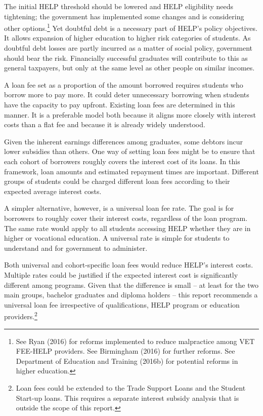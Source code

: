 \documentclass[]{book}
\begin{document}
The initial HELP threshold should be lowered and HELP eligibility needs tightening; the government has implemented some changes and is considering other options.\footnote{See Ryan (2016) for reforms implemented to reduce malpractice among VET FEE-HELP providers. See Birmingham (2016) for further reforms. See Department of Education and Training (2016b) for potential reforms in higher education.} Yet doubtful debt is a necessary part of HELP's policy objectives. It allows expansion of higher education to higher risk categories of students. As doubtful debt losses are partly incurred as a matter of social policy, government should bear the risk. Financially successful graduates will contribute to this as general taxpayers, but only at the same level as other people on similar incomes.

A loan fee set as a proportion of the amount borrowed requires students who borrow more to pay more. It could deter unnecessary borrowing when students have the capacity to pay upfront. Existing loan fees are determined in this manner. It is a preferable model both because it aligns more closely with interest costs than a flat fee and because it is already widely understood.

Given the inherent earnings differences among graduates, some debtors incur lower subsidies than others. One way of setting loan fees might be to ensure that each cohort of borrowers roughly covers the interest cost of its loans. In this framework, loan amounts and estimated repayment times are important. Different groups of students could be charged different loan fees according to their expected average interest costs.

A simpler alternative, however, is a universal loan fee rate. The goal is for borrowers to roughly cover their interest costs, regardless of the loan program. The same rate would apply to all students accessing HELP whether they are in higher or vocational education. A universal rate is simple for students to understand and for government to administer.

Both universal and cohort-specific loan fees would reduce HELP's interest costs. Multiple rates could be justified if the expected interest cost is significantly different among programs. Given that the difference is small -- at least for the two main groups, bachelor graduates and diploma holders -- this report recommends a universal loan fee irrespective of qualifications, HELP program or education providers.\footnote{Loan fees could be extended to the Trade Support Loans and the Student Start-up loans. This requires a separate interest subsidy analysis that is outside the scope of this report.}
\end{document}
